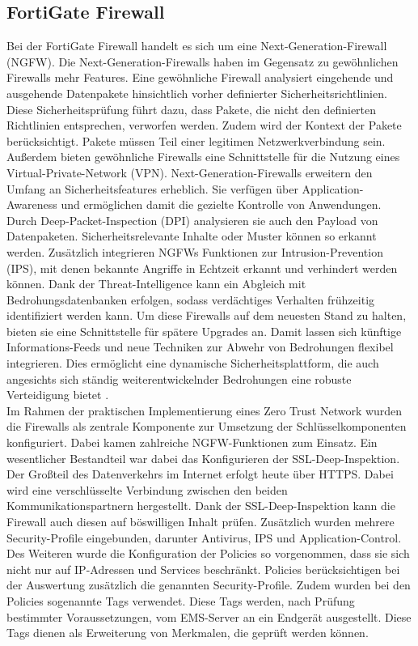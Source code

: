 \documentclass[lettersize,journal]{IEEEtran}
\begin{document}
\subsection{FortiGate Firewall}
Bei der FortiGate Firewall handelt es sich um eine Next-Generation-Firewall (NGFW). Die Next-Generation-Firewalls haben im Gegensatz zu gewöhnlichen Firewalls mehr Features. Eine gewöhnliche Firewall analysiert eingehende und ausgehende Datenpakete hinsichtlich vorher definierter Sicherheitsrichtlinien. Diese Sicherheitsprüfung führt dazu, dass Pakete, die nicht den definierten Richtlinien entsprechen, verworfen werden. Zudem wird der Kontext der Pakete berücksichtigt. Pakete müssen Teil einer legitimen Netzwerkverbindung sein. Außerdem bieten gewöhnliche Firewalls eine Schnittstelle für die Nutzung eines Virtual-Private-Network (VPN). Next-Generation-Firewalls erweitern den Umfang an Sicherheitsfeatures erheblich. Sie verfügen über Application-Awareness und ermöglichen damit die gezielte Kontrolle von Anwendungen. Durch Deep-Packet-Inspection (DPI) analysieren sie auch den Payload von Datenpaketen. Sicherheitsrelevante Inhalte oder Muster können so erkannt werden. Zusätzlich integrieren NGFWs Funktionen zur Intrusion-Prevention (IPS), mit denen bekannte Angriffe in Echtzeit erkannt und verhindert werden können. Dank der Threat-Intelligence kann ein Abgleich mit Bedrohungsdatenbanken erfolgen, sodass verdächtiges Verhalten frühzeitig identifiziert werden kann. Um diese Firewalls auf dem neuesten Stand zu halten, bieten sie eine Schnittstelle für spätere Upgrades an. Damit lassen sich künftige Informations-Feeds und neue Techniken zur Abwehr von Bedrohungen flexibel integrieren. Dies ermöglicht eine dynamische Sicherheitsplattform, die auch angesichts sich ständig weiterentwickelnder Bedrohungen eine robuste Verteidigung bietet \cite{cloudflare.com.20250625}.\\
Im Rahmen der praktischen Implementierung eines Zero Trust Network wurden die Firewalls als zentrale Komponente zur Umsetzung der Schlüsselkomponenten konfiguriert. Dabei kamen zahlreiche NGFW-Funktionen zum Einsatz. Ein wesentlicher Bestandteil war dabei das Konfigurieren der SSL-Deep-Inspektion. Der Großteil des Datenverkehrs im Internet erfolgt heute über HTTPS. Dabei wird eine verschlüsselte Verbindung zwischen den beiden Kommunikationspartnern hergestellt. Dank der SSL-Deep-Inspektion kann die Firewall auch diesen auf böswilligen Inhalt prüfen. Zusätzlich wurden mehrere Security-Profile eingebunden, darunter Antivirus, IPS und Application-Control. Des Weiteren wurde die Konfiguration der Policies so vorgenommen, dass sie sich nicht nur auf IP-Adressen und Services beschränkt. Policies berücksichtigen bei der Auswertung zusätzlich die genannten Security-Profile. Zudem wurden bei den Policies sogenannte Tags verwendet. Diese Tags werden, nach Prüfung bestimmter Voraussetzungen, vom EMS-Server an ein Endgerät ausgestellt. Diese Tags dienen als Erweiterung von Merkmalen, die geprüft werden können.
\end{document}
